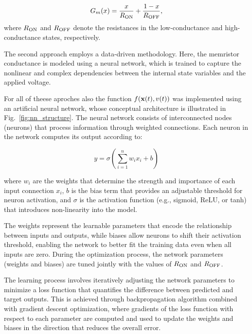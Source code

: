 \documentclass[11pt, oneside]{article}
\newcommand{\Ron}{R_{\rm ON}}
\newcommand{\Roff}{R_{\rm OFF}}
\newcommand{\ua}{v}
\begin{document}
\begin{equation}
    G_{m}(x) = \frac{x}{R_{\rm ON}} + \frac{1 - x}{R_{\rm OFF}},
    \label{eq:conductance}
\end{equation}
where $\Ron$ and $\Roff$ denote the resistances in the low-conductance and high-conductance states, respectively.

The second approach employs a data-driven methodology. Here, the memristor conductance is modeled using a neural network, which is trained to capture the nonlinear and complex dependencies between the internal state variables and the applied voltage.

For all of theese aproches also the function $f(\xvec(t), \ua(t))$ was implemented using an artificial neural network, whose conceptual architecture is illustrated in Fig.~\ref{fig:nn_structure}. The neural network consists of interconnected nodes (neurons) that process information through weighted connections. Each neuron in the network computes its output according to:

\begin{equation}
    y = \sigma\left(\sum_{i=1}^{n} w_i x_i + b\right)
\end{equation}

where $w_i$ are the weights that determine the strength and importance of each input connection $x_i$, $b$ is the bias term that provides an adjustable threshold for neuron activation, and $\sigma$ is the activation function (e.g., sigmoid, ReLU, or tanh) that introduces non-linearity into the model.

The weights represent the learnable parameters that encode the relationship between inputs and outputs, while biases allow neurons to shift their activation threshold, enabling the network to better fit the training data even when all inputs are zero. During the optimization process, the network parameters (weights and biases) are tuned jointly with the values of $R_{\rm ON}$ and $R_{\rm OFF}$.

The learning process involves iteratively adjusting the network parameters to minimize a loss function that quantifies the difference between predicted and target outputs. This is  achieved through backpropagation algorithm combined with gradient descent optimization, where gradients of the loss function with respect to each parameter are computed and used to update the weights and biases in the direction that reduces the overall error.
\end{document}
